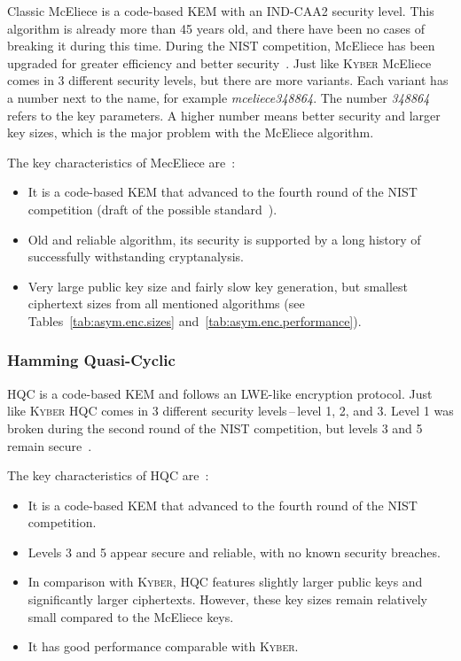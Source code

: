Classic McEliece is a code-based KEM with an IND-CAA2 security level. This algorithm is already more than 45 years old, and there have been no cases of breaking it during this time. During the NIST competition, McEliece has been upgraded for greater efficiency and better security~\cite{pqc.survey.7030040,kem.McEliece}. Just like \textsc{Kyber} McEliece comes in 3 different security levels, but there are more variants. Each variant has a number next to the name, for example \emph{mceliece348864}. The number \emph{348864} refers to the key parameters. A higher number means better security and larger key sizes, which is the major problem with the McEliece algorithm.

\noindent The key characteristics of MecEliece are~\cite{NIST.round3.report}:

\begin{itemize}
    \item It is a code-based KEM that advanced to the fourth round of the NIST competition (draft of the possible standard~\cite{kem.man.McEliece}).
    \item Old and reliable algorithm, its security is supported by a long history of successfully withstanding cryptanalysis.
    \item Very large public key size and fairly slow key generation, but smallest ciphertext sizes from all mentioned algorithms (see Tables~\ref{tab:asym.enc.sizes} and~\ref{tab:asym.enc.performance}).
\end{itemize}

\subsubsection{Hamming Quasi-Cyclic}

HQC is a code-based KEM and follows an LWE-like encryption protocol. Just like \textsc{Kyber} HQC comes in 3 different security levels\,--\,level 1, 2, and 3. Level 1 was broken during the second round of the NIST competition, but levels 3 and 5 remain secure~\cite{pqc.survey.7030040,kem.HQC}.

\noindent The key characteristics of HQC are~\cite{NIST.round3.report}:

\begin{itemize}
    \item It is a code-based KEM that advanced to the fourth round of the NIST competition.
    \item Levels 3 and 5 appear secure and reliable, with no known security breaches.
    \item In comparison with \textsc{Kyber}, HQC features slightly larger public keys and significantly larger ciphertexts. However, these key sizes remain relatively small compared to the McEliece keys.
    \item It has good performance comparable with \textsc{Kyber}.
\end{itemize}

